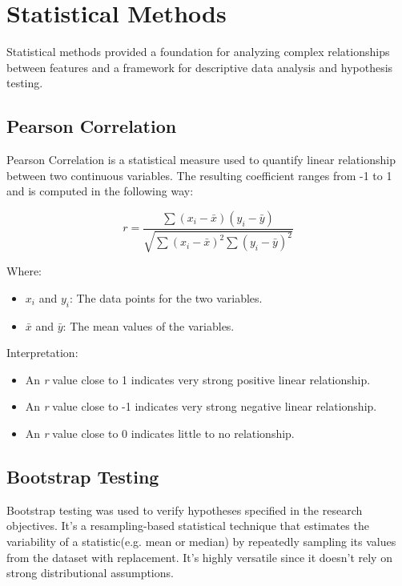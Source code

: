 \section{Statistical Methods}
\label{sec:statisticalmethods}

Statistical methods provided a foundation for analyzing complex relationships
between features and a framework for descriptive data analysis and hypothesis
testing.

\subsection{Pearson Correlation}

Pearson Correlation is a statistical measure used to quantify linear
relationship between two continuous variables. The resulting coefficient ranges
from -1 to 1 and is computed in the following way:

\[
r = \frac{\sum{(x_i - \bar{x})(y_i - \bar{y})}}{\sqrt{\sum{(x_i - \bar{x})^2} \sum{(y_i - \bar{y})^2}}}
\]

\noindent \noindent Where:
\begin{itemize}
    \item \( x_i \) and \( y_i \): The data points for the two variables.
    \item \( \bar{x} \) and \( \bar{y} \): The mean values of the variables.
\end{itemize}

\noindent \noindent Interpretation:
\begin{itemize}
  \item An \textit{r} value close to 1 indicates very strong positive linear
    relationship.
  \item An \textit{r} value close to -1 indicates very strong negative linear
    relationship.
  \item An \textit{r} value close to 0 indicates little to no relationship.
\end{itemize}



\subsection{Bootstrap Testing}

Bootstrap testing was used to verify hypotheses specified in the research
objectives. It's a resampling-based statistical technique that estimates the
variability of a statistic(e.g. mean or median)  by repeatedly sampling its
values from the dataset with replacement. It's highly versatile since it
doesn't rely on strong distributional assumptions.


